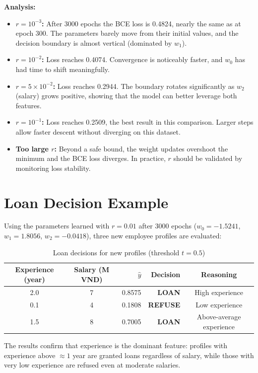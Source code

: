 \documentclass[12pt,a4paper]{article}
\begin{document}
\noindent\textbf{Analysis:}
\begin{itemize}
    \item \textbf{$r = 10^{-3}$:} After 3000 epochs the BCE loss is 0.4824, nearly the same as at epoch 300. The parameters barely move from their initial values, and the decision boundary is almost vertical (dominated by $w_1$).
    \item \textbf{$r = 10^{-2}$:} Loss reaches 0.4074. Convergence is noticeably faster, and $w_0$ has had time to shift meaningfully.
    \item \textbf{$r = 5\times10^{-2}$:} Loss reaches 0.2944. The boundary rotates significantly as $w_2$ (salary) grows positive, showing that the model can better leverage both features.
    \item \textbf{$r = 10^{-1}$:} Loss reaches 0.2509, the best result in this comparison. Larger steps allow faster descent without diverging on this dataset.
    \item \textbf{Too large $r$:} Beyond a safe bound, the weight updates overshoot the minimum and the BCE loss diverges. In practice, $r$ should be validated by monitoring loss stability.
\end{itemize}

\section{Loan Decision Example}

Using the parameters learned with $r = 0.01$ after 3000 epochs ($w_0 = -1.5241$, $w_1 = 1.8056$, $w_2 = -0.0418$), three new employee profiles are evaluated:

\begin{table}[H]
\centering
\caption{Loan decisions for new profiles (threshold $t = 0.5$)}
\begin{tabular}{ccrrc}
\toprule
\textbf{Experience (year)} & \textbf{Salary (M VND)} & $\hat{y}$ & \textbf{Decision} & \textbf{Reasoning} \\
\midrule
2.0 & 7 & 0.8575 & \textbf{LOAN}   & High experience \\
0.1 & 4 & 0.1808 & \textbf{REFUSE} & Low experience \\
1.5 & 8 & 0.7005 & \textbf{LOAN}   & Above-average experience \\
\bottomrule
\end{tabular}
\end{table}

The results confirm that experience is the dominant feature: profiles with experience above $\approx 1$ year are granted loans regardless of salary, while those with very low experience are refused even at moderate salaries.
\end{document}
